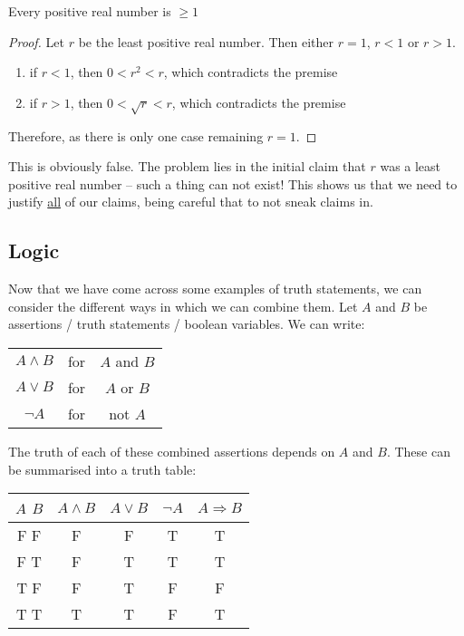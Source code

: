 \documentclass{article}
\begin{document}
\begin{assert}
    Every positive real number is $\geq 1$
\end{assert}

\begin{proof}
    Let $r$ be the least positive real number. Then either $r = 1$, $r < 1$ or $r > 1$.
    \begin{enumerate}[cases]
        \item if $r < 1$, then $0 < r^2 < r$, which contradicts the premise \contradiction
        \item if $r > 1$, then $0 < \sqrt{r} < r$, which contradicts the premise \contradiction
    \end{enumerate}
    Therefore, as there is only one case remaining $r = 1$.
\end{proof}

This is obviously false. The problem lies in the initial claim that $r$ was a least positive real number -- such a thing can not exist! This shows us that we need to justify \underline{all} of our claims, being careful that to not sneak claims in.

\subsection{Logic}

Now that we have come across some examples of truth statements, we can consider the different ways in which we can combine them. Let $A$ and $B$ be assertions / truth statements / boolean variables. We can write:
\begin{center}
    \begin{tabular}{ c c c }
        $A \wedge B$ & for & $A$ and $B$ \\
        $A \vee B$ & for & $A$ or $B$ \\
        $\neg A$ & for & not $A$
    \end{tabular}
\end{center}
The truth of each of these combined assertions depends on $A$ and $B$. These can be summarised into a truth table:
\begin{center}
    \begin{tabular}{ c|c|c|c|c }
    $A$ \quad $B$ & $A \wedge B$ & $A \vee B$ & $\neg A$ & $A \Rightarrow B$ \\
    \midrule
    F \quad F & F & F & T & T \\
    F \quad T & F & T & T & T \\
    T \quad F & F & T & F & F \\
    T \quad T & T & T & F & T \\
    \end{tabular}
\end{center}
\end{document}
